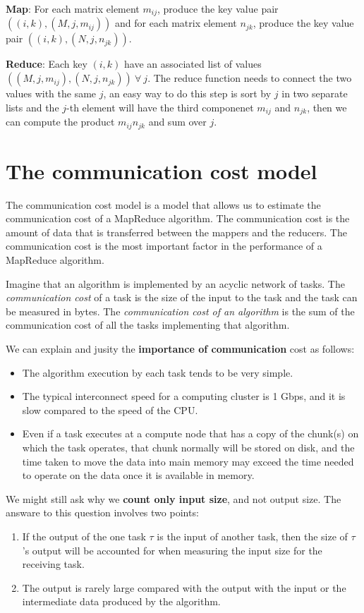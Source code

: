 \textbf{Map}: For each matrix element $m_{ij}$, produce the key value pair $((i, k), (M, j, m_{ij}))$ and for each matrix element $n_{jk}$, produce the key value pair $((i, k), (N, j, n_{jk}))$.

\textbf{Reduce}: Each key $(i, k)$ have an associated list of values $((M, j, m_{ij}), (N, j, n_{jk})) \ \forall \ j$. The reduce function needs to connect the two values with the same $j$, an easy way to do this step is sort by $j$ in two separate lists and the $j$-th element will have the third componenet $m_{ij}$ and $n_{jk}$, then we can compute the product $m_{ij}n_{jk}$ and sum over $j$.


\section{The communication cost model}\label{sec:communication-cost-model}

The communication cost model is a model that allows us to estimate the communication cost of a MapReduce algorithm. The communication cost is the amount of data that is transferred between the mappers and the reducers. The communication cost is the most important factor in the performance of a MapReduce algorithm. 

Imagine that an algorithm is implemented by an acyclic network of tasks. The \textit{communication cost} of a task is the size of the input to the task and the task can be measured in bytes. The \textit{communication cost of an algorithm} is the sum of the communication cost of all the tasks implementing that algorithm.

We can explain and jusity the \textbf{importance of communication} cost as follows:
\begin{itemize}
    \item The algorithm execution by each task tends to be very simple.
    \item The typical interconnect speed for a computing cluster is 1 Gbps, and it is slow compared to the speed of the CPU.
    \item Even if a task executes at a compute node that has a copy of the chunk(s) on which the task operates, that chunk normally will be stored on disk, and the time taken to move the data into main memory may exceed the time needed to operate on the data once it is available in memory.
\end{itemize}

We might still ask why we \textbf{count only input size}, and not output size. The answare to this question involves two points:
\begin{enumerate}
    \item If the output of the one task $\tau$ is the input of another task, then the size of $\tau$'s output will be accounted for when measuring the input size for the receiving task.
    \item The output is rarely large compared with the output with the input or the intermediate data produced by the algorithm. 
\end{enumerate}

